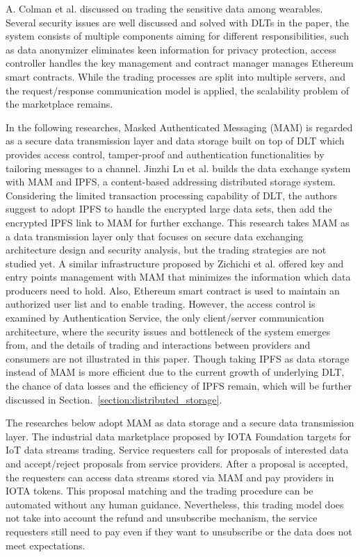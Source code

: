 \documentclass[conference]{IEEEtran}
\begin{document}
A. Colman et al. \cite{TrustedMarketplaceWearable} discussed on trading the sensitive data among wearables. Several security issues are well discussed and solved with DLTs in the paper, the system consists of multiple components aiming for different responsibilities, such as data anonymizer eliminates keen information for privacy protection, access controller handles the key management and contract manager manages Ethereum smart contracts. While the trading processes are split into multiple servers, and the request/response communication model is applied, the scalability problem of the marketplace remains.

In the following researches, Masked Authenticated Messaging (MAM)\cite{MAM} is regarded as a secure data transmission layer and data storage built on top of DLT which provides access control, tamper-proof and authentication functionalities by tailoring messages to a channel. Jinzhi Lu et al.\cite{luDecentralizedDM} builds the data exchange system with MAM and IPFS\cite{IPFS}, a content-based addressing distributed storage system. Considering the limited transaction processing capability of DLT, the authors suggest to adopt IPFS to handle the encrypted large data sets, then add the encrypted IPFS link to MAM for further exchange. This research takes MAM as a data transmission layer only that focuses on secure data exchanging architecture design and security analysis, but the trading strategies are not studied yet. A similar infrastructure proposed by Zichichi et al.\cite{SocialGood} offered key and entry points management with MAM that minimizes the information which data producers need to hold. Also, Ethereum smart contract is used to maintain an authorized user list and to enable trading. However, the access control is examined by Authentication Service, the only client/server communication architecture, where the security issues and bottleneck of the system emerges from, and the details of trading and interactions between providers and consumers are not illustrated in this paper. Though taking IPFS as data storage instead of MAM is more efficient due to the current growth of underlying DLT, the chance of data losses and the efficiency of IPFS remain, which will be further discussed in Section.~\ref{section:distributed_storage}.

The researches below adopt MAM as data storage and a secure data transmission layer. The industrial data marketplace\cite{IOTAIdustryMarketplace} proposed by IOTA Foundation targets for IoT data streams trading. Service requesters call for proposals of interested data and accept/reject proposals from service providers. After a proposal is accepted, the requesters can access data streams stored via MAM and pay providers in IOTA tokens. This proposal matching and the trading procedure can be automated without any human guidance\cite{IOTAIdustryMarketplaceWithoutHuman}. Nevertheless, this trading model does not take into account the refund and unsubscribe mechanism, the service requesters still need to pay even if they want to unsubscribe or the data does not meet expectations.
\end{document}
